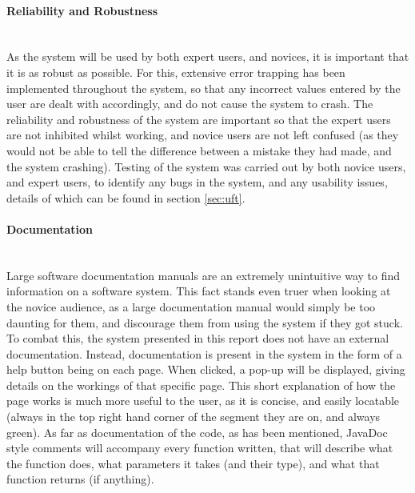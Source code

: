 \paragraph{Reliability and Robustness}\ \\
As the system will be used by both expert users, and novices, it is important that it is as robust as possible. For this, extensive error trapping has been implemented throughout the system, so that any incorrect values entered by the user are dealt with accordingly, and do not cause the system to crash. The reliability and robustness of the system are important so that the expert users are not inhibited whilst working, and novice users are not left confused (as they would not be able to tell the difference between a mistake they had made, and the system crashing). Testing of the system was carried out by both novice users, and expert users, to identify any bugs in the system, and any usability issues, details of which can be found in section \ref{sec:uft}.

\paragraph{Documentation}\ \\
Large software documentation manuals are an extremely unintuitive way to find information on a software system. This fact stands even truer when looking at the novice audience, as a large documentation manual would simply be too daunting for them, and discourage them from using the system if they got stuck. To combat this, the system presented in this report does not have an external documentation. Instead, documentation is present in the system in the form of a help button being on each page. When clicked, a pop-up will be displayed, giving details on the workings of that specific page. This short explanation of how the page works is much more useful to the user, as it is concise, and easily locatable (always in the top right hand corner of the segment they are on, and always green). As far as documentation of the code, as has been mentioned, JavaDoc style comments will accompany every function written, that will describe what the function does, what parameters it takes (and their type), and what that function returns (if anything). 

